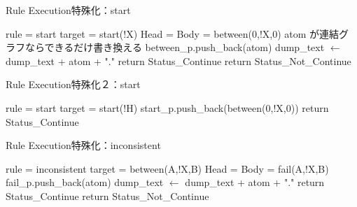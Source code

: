 \begin{algorithm}
    \caption{Rule Execution特殊化：start}
\begin{algorithmic}
    \scriptsize
    \Require rule = start
    \Require target = start(!X)
    \Require Head = {}
    \Require Body = {between(0,!X,0)}
         
                \State atom が連結グラフならできるだけ書き換える
                 
                    \State between\_p.push\_back(atom)
                \Else {}
                    \State dump\_text $\gets$ dump\_text + atom + "."
                \EndIf
            \EndFor
             
                \State return Status\_Continue
            \EndIf
        \EndIf
        \State return Status\_Not\_Continue
    \EndProcedure
\end{algorithmic}
\end{algorithm}

\begin{algorithm}
    \caption{Rule Execution特殊化２：start}
\begin{algorithmic}
    \scriptsize
    \Require rule = start
    \Require target = start(!H)
            \State start\_p.push\_back(between(0,!X,0))
            \State return Status\_Continue
    \EndProcedure
\end{algorithmic}
\end{algorithm}

\begin{algorithm}
    \caption{Rule Execution特殊化：inconsistent}
\begin{algorithmic}
    \scriptsize
    \Require rule = inconsistent
    \Require target = between(A,!X,B)
    \Require Head = {}
    \Require Body = {fail(A,!X,B)}
                 
                    \State fail\_p.push\_back(atom)
                \Else {}
                    \State dump\_text $\gets$ dump\_text + atom + "."
                \EndIf
            \EndFor
             
                \State return Status\_Continue
            \EndIf
        \EndIf
        \State return Status\_Not\_Continue
    \EndProcedure
\end{algorithmic}
\end{algorithm}

